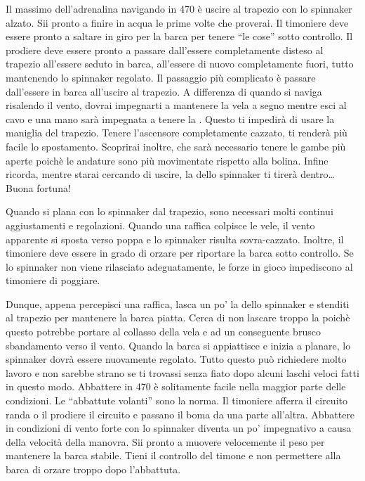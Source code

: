 Il massimo dell'adrenalina navigando in 470 è uscire al trapezio con lo spinnaker
alzato. Sii pronto a finire in acqua le prime volte che proverai. Il timoniere
deve essere pronto a saltare in giro per la barca per tenere ``le cose'' sotto
controllo. Il prodiere deve essere pronto a passare dall'essere completamente
disteso al trapezio all'essere seduto in barca, all'essere di nuovo
completamente fuori, tutto mantenendo lo spinnaker regolato. Il passaggio più
complicato è passare dall'essere in barca all'uscire al trapezio. A differenza
di quando si naviga risalendo il vento, dovrai impegnarti a mantenere la vela a
segno mentre esci al cavo e una mano sarà impegnata a tenere la \sheet. Questo
ti impedirà di usare la maniglia del trapezio. Tenere l'ascensore completamente
cazzato, ti renderà più facile lo spostamento. Scoprirai inoltre, che sarà
necessario tenere le gambe più aperte poichè le andature sono più
movimentate rispetto alla bolina. Infine ricorda, mentre starai cercando di
uscire, la \sheet dello spinnaker ti tirerà dentro\dots Buona fortuna!

Quando si plana con lo spinnaker dal trapezio, sono necessari molti continui
aggiustamenti e regolazioni. Quando una raffica colpisce le vele, il vento
apparente si sposta verso poppa e lo spinnaker risulta sovra-cazzato. Inoltre,
il timoniere deve essere in grado di orzare per riportare la barca sotto
controllo. Se lo spinnaker non viene rilasciato adeguatamente, le forze in gioco
impediscono al timoniere di poggiare.

Dunque, appena percepisci una raffica, lasca un po' la \sheet dello spinnaker e
stenditi al trapezio per mantenere la barca piatta. Cerca di non lascare
troppo la \sheet poichè questo potrebbe portare al collasso della vela e ad un
conseguente brusco sbandamento verso il vento. Quando la barca si appiattisce e
inizia a planare, lo spinnaker dovrà essere nuovamente regolato. Tutto questo
può richiedere molto lavoro e non sarebbe strano se ti trovassi senza fiato dopo
alcuni laschi veloci fatti in questo modo. Abbattere in 470 è solitamente facile
nella maggior parte delle condizioni. Le ``abbattute volanti'' sono la norma. Il
timoniere afferra il circuito \sheet randa o il prodiere il circuito \vang e
passano il boma da una parte all'altra. Abbattere in condizioni di vento forte
con lo spinnaker diventa un po' impegnativo a causa della velocità della
manovra. Sii pronto a muovere velocemente il peso per mantenere la barca
stabile. Tieni il controllo del timone e non permettere alla barca di orzare
troppo dopo l'abbattuta.

